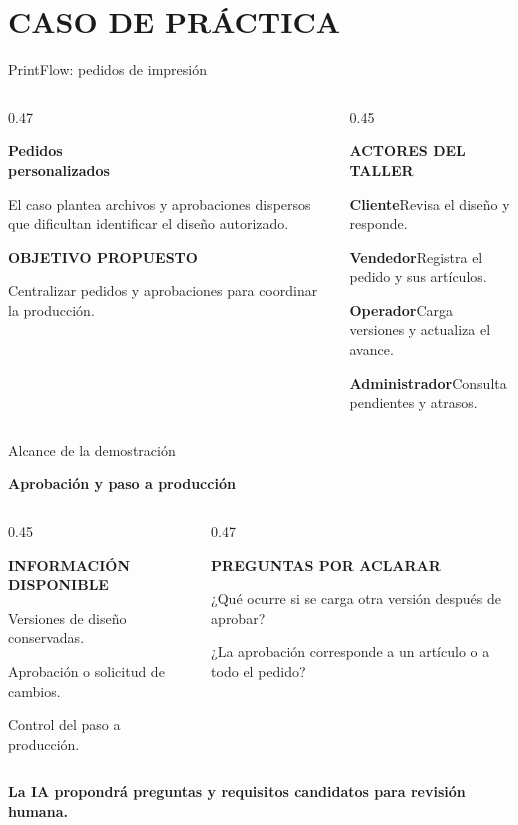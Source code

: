 \documentclass[aspectratio=169,12pt]{beamer}
\newcommand{\etiqueta}[1]{{\fontsize{7.5}{9}\selectfont\bfseries\color{Accent}#1\par}}
\newcommand{\texto}[1]{{\fontsize{11}{14}\selectfont #1\par}}
\newcommand{\fuentesactuales}{}
\newcommand{\fuentesdiapositiva}[1]{\gdef\fuentesactuales{#1}}
\begin{document}
\section{CASO DE PRÁCTICA}
\begin{frame}[t]{PrintFlow: pedidos de impresión}
\fuentesdiapositiva{}
\begin{columns}[T,onlytextwidth]
\begin{column}{0.47\textwidth}
{\fontsize{21}{25}\selectfont\bfseries Pedidos\\personalizados\par}
\vspace{3mm}
\texto{El caso plantea archivos y aprobaciones dispersos que dificultan
identificar el diseño autorizado.}
\vspace{3mm}
\etiqueta{OBJETIVO PROPUESTO}
\texto{Centralizar pedidos y aprobaciones para coordinar la producción.}
\end{column}
\begin{column}{0.45\textwidth}
\etiqueta{ACTORES DEL TALLER}
\vspace{2mm}
\texto{\textbf{Cliente}\quad Revisa el diseño y responde.}
\vspace{2mm}
\texto{\textbf{Vendedor}\quad Registra el pedido y sus artículos.}
\vspace{2mm}
\texto{\textbf{Operador}\quad Carga versiones y actualiza el avance.}
\vspace{2mm}
\texto{\textbf{Administrador}\quad Consulta pendientes y atrasos.}
\end{column}
\end{columns}
\end{frame}

\begin{frame}[t]{Alcance de la demostración}
\fuentesdiapositiva{}
{\fontsize{17}{21}\selectfont\bfseries Aprobación y paso a producción\par}
\vspace{3mm}
\begin{columns}[T,onlytextwidth]
\begin{column}{0.45\textwidth}
\etiqueta{INFORMACIÓN DISPONIBLE}
\vspace{2mm}
\texto{Versiones de diseño conservadas.}
\vspace{2.5mm}
\texto{Aprobación o solicitud de cambios.}
\vspace{2.5mm}
\texto{Control del paso a producción.}
\end{column}
\begin{column}{0.47\textwidth}
\etiqueta{PREGUNTAS POR ACLARAR}
\vspace{2mm}
\texto{¿Qué ocurre si se carga otra versión después de aprobar?}
\vspace{3mm}
\texto{¿La aprobación corresponde a un artículo o a todo el pedido?}
\end{column}
\end{columns}
\vfill
{\fontsize{9}{11}\selectfont\color{Accent}\bfseries
La IA propondrá preguntas y requisitos candidatos para revisión humana.\par}
\vspace{1mm}
\end{frame}
\end{document}
